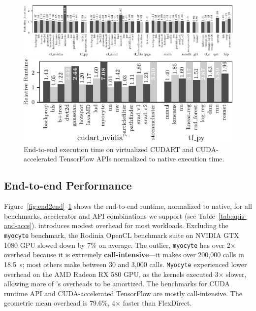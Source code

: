 \begin{figure}
	\centering

	\includegraphics[width=\linewidth]{ava/data/end2end/end2end_all.pdf}
	\caption{End-to-end execution time on virtualized APIs or accelerators
	normalized to native execution time. \lstinline|tf_py| is the handwritten
	TensorFlow Python API remoting with \AvA API-agnostic components.}
	\label{fig:end2end}

	\includegraphics[width=0.6\linewidth]{ava/data/end2end/end2end_cudart.pdf}%
	\vspace*{-.1em}
	\caption{End-to-end execution time on virtualized CUDART and CUDA-accelerated TensorFlow APIs normalized to native execution time.}
	\label{fig:end2end_cudart}

\end{figure}

\subsection{End-to-end Performance}

Figure~\ref{fig:end2end}--\ref{fig:end2end_cudart} shows the end-to-end
runtime, normalized to native, for all benchmarks, accelerator and API
combinations we support (see Table~\ref{tab:apis-and-accs}).
\AvA introduces modest overhead for most workloads. Excluding the
\texttt{myocyte} benchmark, the Rodinia OpenCL benchmark suite on NVIDIA GTX
1080 GPU slowed down by 7\% on average. The outlier, \texttt{myocyte} has over
2$\times$ overhead because it is extremely \textbf{call-intensive}---it
makes over 200,000 calls in \SI{18.5}{\second}; most others make between 30
and 3,000 calls. \texttt{Myocyte} experienced lower overhead on the AMD Radeon
RX 580 GPU, as the kernels executed 3$\times$ slower, allowing more of \AvA's
overheads to be amortized. The benchmarks for CUDA runtime API and
CUDA-accelerated TensorFlow are mostly call-intensive. The geometric mean
overhead is 79.6\%, 4$\times$ faster than FlexDirect.

